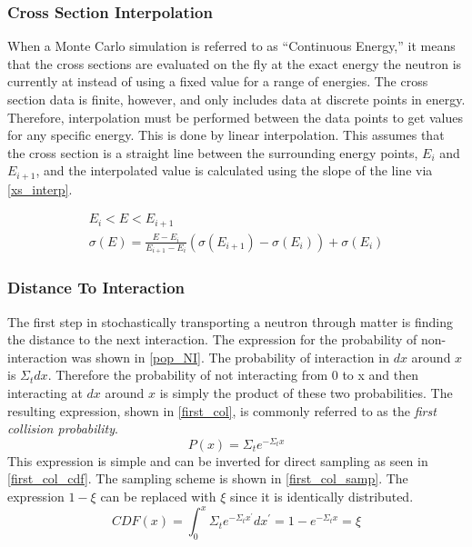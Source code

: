 \subsubsection{Cross Section Interpolation}

When a Monte Carlo simulation is referred to as ``Continuous Energy,'' it means that the cross sections are evaluated on the fly at the exact energy the neutron is currently at instead of using a fixed value for a range of energies.  The cross section data is finite, however, and only includes data at discrete points in energy.  Therefore, interpolation must be performed between the data points to get values for any specific energy.  This is done by linear interpolation.  This assumes that the cross section is a straight line between the surrounding energy points, $E_i$ and $E_{i+1}$, and the interpolated value is calculated using the slope of the line via \eqref{xs_interp}.

 \begin{equation}
\label{xs_interp}
\begin{gathered}
E_i < E < E_{i+1} \\
\sigma(E) = \frac{E-E_i}{E_{i+1}-E_i}(\sigma(E_{i+1})-\sigma(E_i)) + \sigma(E_i)
\end{gathered}
\end{equation}



\subsubsection{Distance To Interaction}

The first step in stochastically transporting a neutron through matter is finding the distance to the next interaction.  The expression for the probability of non-interaction was shown in \eqref{pop_NI}.  The probability of interaction in $dx$ around $x$ is $\Sigma_t dx$.  Therefore the probability of not interacting from 0 to x and then interacting at $dx$ around $x$ is simply the product of these two probabilities.  The resulting expression, shown in \eqref{first_col}, is commonly referred to as the \emph{first collision probability}.
%
\begin{equation}
\label{first_col}
P(x) = \Sigma_t e^{- \Sigma_t  x}
\end{equation}
%
This expression is simple and can be inverted for direct sampling as seen in \eqref{first_col_cdf}.  The sampling scheme is shown in \eqref{first_col_samp}.  The expression $1-\xi$ can be replaced with $\xi$ since it is identically distributed.
%
\begin{equation}
\label{first_col_cdf}
CDF(x) = \int_0^x \Sigma_t e^{- \Sigma_t  x^\prime} dx^\prime = 1- e^{- \Sigma_t  x} = \xi
\end{equation}

